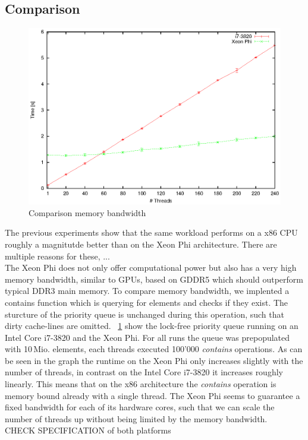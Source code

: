 \subsection{Comparison}
\begin{figure}[t]
	\centering
	\includegraphics[width=0.9\columnwidth]{../plots/comp_contains/runtime_contains}
	\caption{Comparison memory bandwidth}
	\label{fig:comp_contains}
\end{figure}
The previous experiments show that the same workload performs on a x86 CPU roughly a magnitutde better than on the Xeon Phi architecture. There are multiple reasons for these, ...\\ %
The Xeon Phi does not only offer computational power but also has a very high memory bandwidth, similar to GPUs, based on GDDR5 which should outperform typical DDR3 main memory. To compare memory bandwidth, we implented a contains function which is querying for elements and checks if they exist. The sturcture of the priority queue is unchanged during this operation, such that dirty cache-lines are omitted. \figurename~\ref{fig:comp_contains} show the lock-free priority queue running on an Intel Core i7-3820 and the Xeon Phi. For all runs the queue was prepopulated with 10\,Mio. elements, each threads executed 100'000 \textit{contains} operations. As can be seen in the graph the runtime on the Xeon Phi only increases slightly with the number of threads, in contrast on the Intel Core i7-3820 it increases roughly linearly. This means that on the x86 architecture the \textit{contains} operation is memory bound already with a single thread. The Xeon Phi seems to guarantee a fixed bandwidth for each of its hardware cores, such that we can scale the number of threads up without being limited by the memory bandwidth.\\
CHECK SPECIFICATION of both platforms

